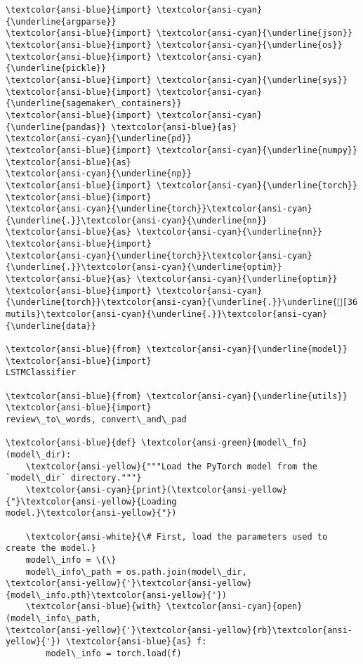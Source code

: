 \documentclass[11pt]{article}
\begin{document}
    \begin{Verbatim}[commandchars=\\\{\}]
\textcolor{ansi-blue}{import} \textcolor{ansi-cyan}{\underline{argparse}}
\textcolor{ansi-blue}{import} \textcolor{ansi-cyan}{\underline{json}}
\textcolor{ansi-blue}{import} \textcolor{ansi-cyan}{\underline{os}}
\textcolor{ansi-blue}{import} \textcolor{ansi-cyan}{\underline{pickle}}
\textcolor{ansi-blue}{import} \textcolor{ansi-cyan}{\underline{sys}}
\textcolor{ansi-blue}{import} \textcolor{ansi-cyan}{\underline{sagemaker\_containers}}
\textcolor{ansi-blue}{import} \textcolor{ansi-cyan}{\underline{pandas}} \textcolor{ansi-blue}{as}
\textcolor{ansi-cyan}{\underline{pd}}
\textcolor{ansi-blue}{import} \textcolor{ansi-cyan}{\underline{numpy}} \textcolor{ansi-blue}{as}
\textcolor{ansi-cyan}{\underline{np}}
\textcolor{ansi-blue}{import} \textcolor{ansi-cyan}{\underline{torch}}
\textcolor{ansi-blue}{import}
\textcolor{ansi-cyan}{\underline{torch}}\textcolor{ansi-cyan}{\underline{.}}\textcolor{ansi-cyan}{\underline{nn}}
\textcolor{ansi-blue}{as} \textcolor{ansi-cyan}{\underline{nn}}
\textcolor{ansi-blue}{import}
\textcolor{ansi-cyan}{\underline{torch}}\textcolor{ansi-cyan}{\underline{.}}\textcolor{ansi-cyan}{\underline{optim}}
\textcolor{ansi-blue}{as} \textcolor{ansi-cyan}{\underline{optim}}
\textcolor{ansi-blue}{import} \textcolor{ansi-cyan}{\underline{torch}}\textcolor{ansi-cyan}{\underline{.}}\underline{[36
mutils}\textcolor{ansi-cyan}{\underline{.}}\textcolor{ansi-cyan}{\underline{data}}

\textcolor{ansi-blue}{from} \textcolor{ansi-cyan}{\underline{model}} \textcolor{ansi-blue}{import}
LSTMClassifier

\textcolor{ansi-blue}{from} \textcolor{ansi-cyan}{\underline{utils}} \textcolor{ansi-blue}{import}
review\_to\_words, convert\_and\_pad

\textcolor{ansi-blue}{def} \textcolor{ansi-green}{model\_fn}(model\_dir):
    \textcolor{ansi-yellow}{"""Load the PyTorch model from the `model\_dir` directory."""}
    \textcolor{ansi-cyan}{print}(\textcolor{ansi-yellow}{"}\textcolor{ansi-yellow}{Loading
model.}\textcolor{ansi-yellow}{"})

    \textcolor{ansi-white}{\# First, load the parameters used to create the model.}
    model\_info = \{\}
    model\_info\_path = os.path.join(model\_dir,
\textcolor{ansi-yellow}{'}\textcolor{ansi-yellow}{model\_info.pth}\textcolor{ansi-yellow}{'})
    \textcolor{ansi-blue}{with} \textcolor{ansi-cyan}{open}(model\_info\_path,
\textcolor{ansi-yellow}{'}\textcolor{ansi-yellow}{rb}\textcolor{ansi-yellow}{'}) \textcolor{ansi-blue}{as} f:
        model\_info = torch.load(f)


\end{Verbatim}
\end{document}
